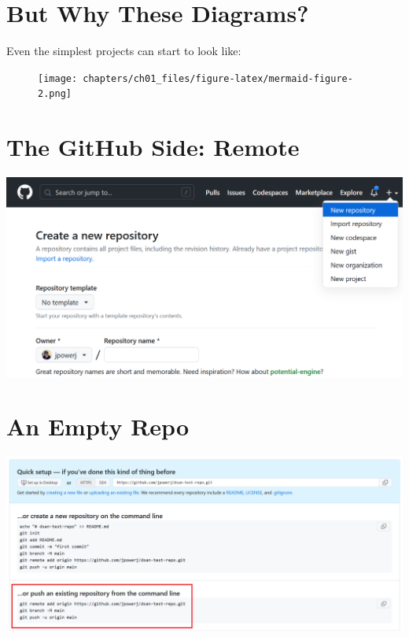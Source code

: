 \documentclass[
  letterpaper,
  DIV=11,
  numbers=noendperiod,
  oneside]{scrreprt}
\begin{document}
\hypertarget{but-why-these-diagrams}{%
\section{But Why These Diagrams?}\label{but-why-these-diagrams}}

Even the simplest projects can start to look like:

\begin{figure}[H]

{\centering \texttt{[image: chapters/ch01\_files/figure-latex/mermaid-figure-2.png]}

}

\end{figure}

\hypertarget{the-github-side-remote}{%
\section{The GitHub Side: Remote}\label{the-github-side-remote}}

\includegraphics{assets/img/ch00/github_repo.png}

\hypertarget{an-empty-repo}{%
\section{An Empty Repo}\label{an-empty-repo}}

\includegraphics{assets/img/ch00/github_empty_repo.png}
\end{document}
